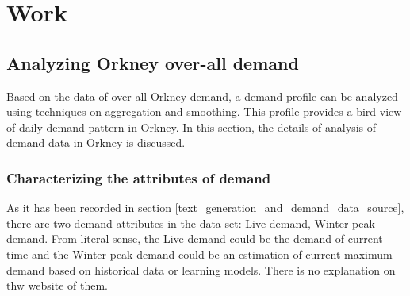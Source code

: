 \documentclass[12pt,a4paper]{report}
\begin{document}
        



    \chapter{Work}
        \section{Analyzing Orkney over-all demand}
        Based on the data of over-all Orkney demand, a demand profile can be analyzed using techniques on aggregation and smoothing. This profile provides a bird view of daily demand pattern in Orkney.
        In this section, the details of analysis of demand data in Orkney is discussed.

                \subsection{Characterizing the attributes of demand}
                \label{text_attributs_of_demand}
                As it has been recorded in section \ref{text_generation_and_demand_data_source}, there are two demand attributes in the data set: Live demand, Winter peak demand. From literal sense, the 
                Live demand could be the demand of current time and the Winter peak demand could be an estimation of current maximum demand based on historical data or learning models. There is no explanation
                on thw website of them.
                
\end{document}
